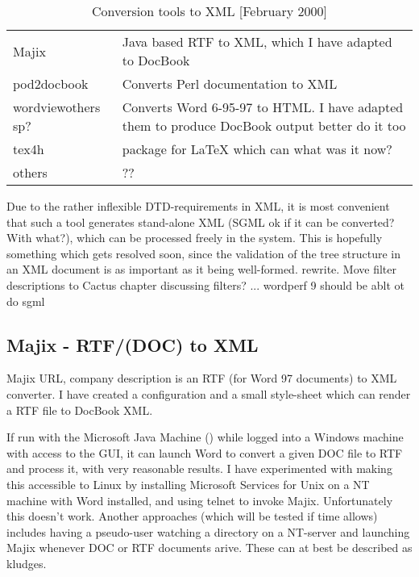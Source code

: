 \begin{table}[htbp]
  \begin{center}
    \begin{tabular}{|l|p{10cm}|}
      \hline\hline
      Majix & Java based RTF to XML, which I have adapted to DocBook
      \\
      pod2docbook & Converts Perl documentation to XML
      \\
      wordview\textsf{others} \textsf{sp?} & Converts \textsf{Word 6-95-97} to
      HTML.  I have adapted them to produce DocBook output
      \textsf{better do it too}
      \\
      tex4h & package for {\LaTeX} which can \textsf{what was it now?}
      \\
      \textsf{others} & ??
      \\
      \hline
    \end{tabular}
    \caption{Conversion tools to XML [February 2000]}
    \label{tab:conversion-tools-to-xml}
  \end{center}
\end{table}
\textsf{
Due to the rather inflexible DTD-requirements in XML, it is most
convenient that such a tool generates stand-alone XML (\textsf{SGML ok
  if it can be converted?  With what?}), which can be processed freely
in the system.  This is hopefully something which gets resolved soon,
since the validation of the tree structure in an XML document is as
important as it being well-formed. \textsf{rewrite.}
}
\textsf{Move filter descriptions to Cactus chapter discussing
  filters?  ... wordperf 9 should be ablt ot do sgml} 
\subsection{Majix - RTF/(DOC) to XML}

Majix \textsf{URL, company description} is an RTF (for Word 97
documents) to XML converter.  I have created a configuration and a
small style-sheet which can render a RTF file to DocBook XML.

If run with the Microsoft Java Machine () while logged
into a Windows machine with access to the GUI, it can launch Word to
convert a given DOC file to RTF and process it, with very reasonable
results.  I have experimented with making this accessible to Linux by
installing Microsoft Services for Unix on a NT machine with Word
installed, and using telnet to invoke Majix.  Unfortunately this
doesn't work.  Another approaches (\textsf{which will be tested if
  time allows}) includes having a pseudo-user watching a directory on
a NT-server and launching Majix whenever DOC or RTF documents arive.
These can at best be described as kludges.

